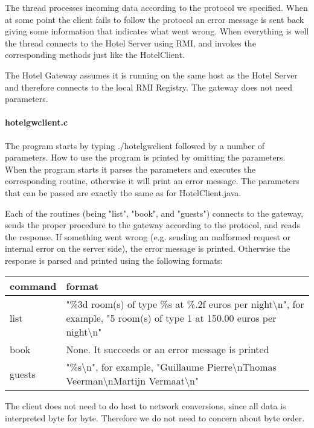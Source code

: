 \documentclass[a4paper,10pt]{article}
\begin{document}
The thread processes incoming data according to the protocol we specified. When at some point the client fails to follow the protocol an error message is sent back giving some information that indicates what went wrong. When everything is well the thread connects to the Hotel Server using RMI, and invokes the corresponding methods just like the HotelClient.

The Hotel Gateway assumes it is running on the same host as the Hotel Server and therefore connects to the local RMI Registry. The gateway does not need parameters.

\paragraph{hotelgwclient.c}
The program starts by typing ./hotelgwclient followed by a number of parameters. How to use the program is printed by omitting the parameters. When the program starts it parses the parameters and executes the corresponding routine, otherwise it will print an error message. The parameters that can be passed are exactly the same as for HotelClient.java.

Each of the routines (being "list", "book", and "guests") connects to the gateway, sends the proper procedure to the gateway according to the protocol, and reads the response. If something went wrong (e.g. sending an malformed request or internal error on the server side), the error message is printed. Otherwise the response is parsed and printed using the following formats:

\begin{center}
\begin{tabular}{ l | p{9.3cm} }
\textbf{command} & \textbf{format}\\ \hline
list & "\%3d room(s) of type \%s at \%.2f euros per night\textbackslash n", for example, "5 room(s) of type 1 at 150.00 euros per night\textbackslash n"\\ \hline
book & None. It succeeds or an error message is printed \\ \hline
guests & "\%s\textbackslash n", for example, "Guillaume Pierre\textbackslash nThomas Veerman\textbackslash nMartijn Vermaat\textbackslash n" \\
\end{tabular}
\end{center}

The client does not need to do host to network conversions, since all data is interpreted byte for byte. Therefore we do not need to concern about byte order.
\end{document}
